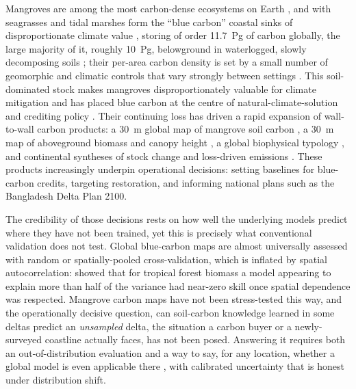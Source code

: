 \documentclass[twocolumn,9pt]{extarticle}
\begin{document}
Mangroves are among the most carbon-dense ecosystems on Earth
\cite{donato2011,mcleod2011}, and with seagrasses and tidal marshes form the
``blue carbon'' coastal sinks of disproportionate climate value \cite{fourqurean2012},
storing of order 11.7~Pg of carbon globally, the large majority of it, roughly 10~Pg, belowground in waterlogged, slowly decomposing soils
\cite{kauffman2020}; their per-area carbon density is set by a small number of
geomorphic and climatic controls that vary strongly between settings \cite{rovai2018}.
This soil-dominated stock makes mangroves disproportionately valuable for climate
mitigation and has placed blue carbon at the centre of natural-climate-solution and
crediting policy \cite{macreadie2021,friess2019}. Their continuing loss
\cite{hamilton2018,richards2020netloss} has driven a rapid expansion of wall-to-wall
carbon products: a 30~m global map of mangrove soil carbon \cite{sanderman2018}, a
30~m map of aboveground biomass and canopy height \cite{simard2019}, a global
biophysical typology \cite{worthington2020}, and continental syntheses of stock change
and loss-driven emissions \cite{richards2020netloss,adame2021future}. These products
increasingly underpin operational decisions: setting baselines for blue-carbon credits,
targeting restoration, and informing national plans such as the Bangladesh Delta Plan
2100.

The credibility of those decisions rests on how well the underlying models predict
where they have not been trained, yet this is precisely what conventional validation
does not test. Global blue-carbon maps are almost universally assessed with random or
spatially-pooled cross-validation, which is inflated by spatial autocorrelation:
\cite{ploton2020} showed that for tropical forest biomass a model appearing to
explain more than half of the variance had near-zero skill once spatial dependence was
respected. Mangrove carbon maps have not been stress-tested this way, and the operationally decisive question, can soil-carbon knowledge learned in some deltas
predict an \emph{unsampled} delta, the situation a carbon buyer or a newly-surveyed
coastline actually faces, has not been posed. Answering it requires both an
out-of-distribution evaluation and a way to say, for any location, whether a global
model is even applicable there \cite{meyer2021}, with calibrated uncertainty that is
honest under distribution shift.
\end{document}
